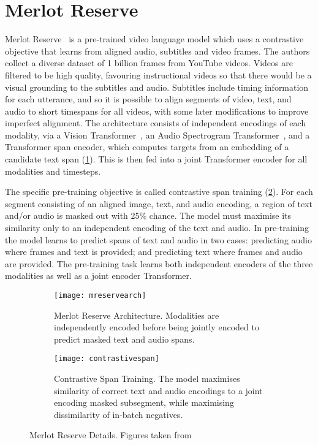 \section{Merlot Reserve}
\label{sec:mreserve}

Merlot Reserve~\citep{zellers2022mreserve} is a pre-trained video language
model which uses a contrastive objective that learns from aligned audio,
subtitles and video frames. The authors collect a diverse dataset of 1 billion
frames from YouTube videos. Videos are filtered to be high quality, favouring
instructional videos so that there would be a visual grounding to the subtitles
and audio. Subtitles include timing information for each utterance, and so it
is possible to align segments of video, text, and audio to short timespans for
all videos, with some later modifications to improve imperfect alignment. The
architecture consists of independent encodings of each modality, via a Vision
Transformer~\citep{dosovitskiy2021vit}, an Audio Spectrogram
Transformer~\citep{gong2021ast}, and a Transformer span encoder, which computes
targets from an embedding of a candidate text span (\cref{fig:mreservearch}).
This is then fed into a joint Transformer encoder for all modalities and
timesteps.

The specific pre-training objective is called contrastive span training
(\cref{fig:contrastivespan}). For each segment consisting of an aligned image,
text, and audio encoding, a region of text and/or audio is masked out with 25\%
chance. The model must maximise its similarity only to an independent encoding
of the text and audio. In pre-training the model learns to predict spans of
text and audio in two cases: predicting audio where frames and text is
provided; and predicting text where frames and audio are provided. The
pre-training task learns both independent encoders of the three modalities as
well as a joint encoder Transformer.

\begin{figure}[tp]
	\centering
	\begin{subfigure}[b]{0.45\textwidth}
		\centering
		\texttt{[image: mreservearch]}
		\caption{Merlot Reserve Architecture. Modalities are independently
		encoded before being jointly encoded to predict masked text and audio
		spans.}
		\label{fig:mreservearch}
	\end{subfigure}
	\hfill
	\begin{subfigure}[b]{0.45\textwidth}
		\centering
		\texttt{[image: contrastivespan]}
		\caption{Contrastive Span Training. The model maximises similarity of
		correct text and audio encodings to a joint encoding masked subsegment,
		while maximising dissimilarity of in-batch negatives.}
		\label{fig:contrastivespan}
	\end{subfigure}
	\caption{Merlot Reserve Details. Figures taken from~\citet{zellers2022mreserve}}
	\label{fig:mreserve}
\end{figure}


